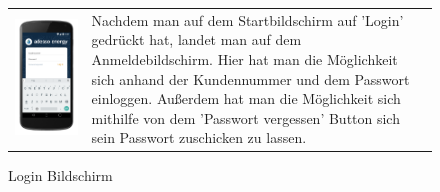 \begin{figure}[h]
\begin{tabularx}{\textwidth}{X  X}
	\includegraphics[scale = 0.155]{img/AndroidMockup/login} \caption {Login Bildschirm} &	Nachdem man auf dem Startbildschirm auf 'Login' gedrückt hat, landet man auf dem Anmeldebildschirm. Hier hat man die Möglichkeit sich anhand der Kundennummer und dem Passwort einloggen. Außerdem hat man die Möglichkeit sich mithilfe von dem 'Passwort vergessen' Button sich sein Passwort zuschicken zu lassen. \\ 
\end{tabularx}
\end{figure}


